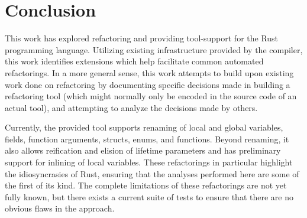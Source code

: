 \section{Conclusion}\label{C:con}

This work has explored refactoring and providing tool-support for the Rust programming language. Utilizing existing infrastructure provided by the compiler, this work identifies extensions which help facilitate common automated refactorings. In a more general sense, this work attempts to build upon existing work done on refactoring by documenting specific decisions made in building a refactoring tool (which might normally only be encoded in the source code of an actual tool), and attempting to analyze the decisions made by others.

Currently, the provided tool supports renaming of local and global variables, fields, function arguments, structs, enums, and functions. Beyond renaming, it also allows reification and elision of lifetime parameters and has preliminary support for inlining of local variables. These refactorings in particular highlight the idiosyncrasies of Rust, ensuring that the analyses performed here are some of the first of its kind. The complete limitations of these refactorings are not yet fully known, but there exists a current suite of tests to ensure that there are no obvious flaws in the approach.
